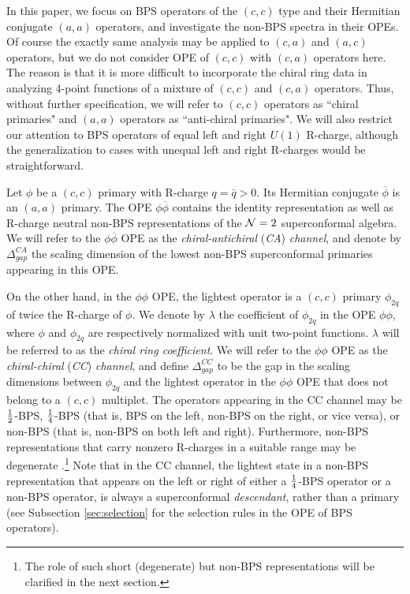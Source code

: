 \documentclass[12pt]{article}
\begin{document}
In this paper, we focus on BPS operators of the $(c,c)$ type and their Hermitian conjugate $(a,a)$ operators, and investigate the non-BPS spectra in their OPEs. Of course the exactly same analysis may be applied to $(c,a)$ and $(a,c)$ operators, but we do not consider OPE of $(c,c)$ with $(c,a)$ operators here. The reason is that it is more difficult to incorporate the chiral ring data in analyzing 4-point functions of a mixture of $(c,c)$ and $(c,a)$ operators. Thus, without further specification, we will refer to $(c,c)$ operators as ``chiral primaries" and $(a,a)$ operators as ``anti-chiral primaries". We will also restrict our attention to BPS operators of equal left and right $U(1)$ R-charge, although the generalization to cases with unequal left and right R-charges would be straightforward.

Let $\phi$ be a  $(c,c)$ primary with R-charge $q=\bar q>0$. Its Hermitian conjugate $\overline\phi$ is an $(a,a)$ primary. The OPE $\phi \overline\phi$ contains the identity representation as well as R-charge neutral non-BPS representations of the ${\cal N}=2$ superconformal algebra.
We will refer to the $\phi\overline\phi$ OPE as the \textit{chiral-antichiral} ({\it CA}) {\it channel}, and denote by $\Delta_{gap}^{CA}$ the scaling dimension of the lowest non-BPS superconformal primaries appearing in this OPE.

On the other hand, in the $\phi\phi$ OPE, the lightest operator is a $(c,c)$ primary $\phi_{2q}$ of twice the R-charge of $\phi$. We denote by $\lambda$ the coefficient of  $\phi_{2q}$ in the OPE $\phi\phi$, where $\phi$ and $\phi_{2q}$ are respectively normalized with unit two-point functions. $\lambda$ will be referred to as the \textit{chiral ring coefficient}. We will refer to the  $\phi\phi$ OPE as the \textit{chiral-chiral} ({\it CC}) {\it channel}, and define $\Delta^{CC}_{gap}$ to be the gap in the scaling dimensions between $\phi_{2q}$ and the lightest operator in the $\phi\phi$ OPE that does not belong to a $(c,c)$ multiplet. The operators appearing in the CC channel may be ${1\over 2}$-BPS, ${1\over 4}$-BPS (that is, BPS on the left, non-BPS on the right, or vice versa), or non-BPS (that is, non-BPS on both left and right). Furthermore, non-BPS representations that carry nonzero R-charges in a suitable range may be degenerate \cite{Boucher:1986bh,Eguchi:1988af,Hosomichi:2004ph}.\footnote{The role of such short (degenerate) but non-BPS representations will be clarified in the next section.} Note that in the CC channel, the lightest state in a non-BPS representation that appears on the left or right of either a ${1\over 4}$-BPS operator or a non-BPS operator, is always a superconformal {\it descendant}, rather than a primary (see Subsection \ref{sec:selection} for the selection rules in the OPE of BPS operators).   
\end{document}
